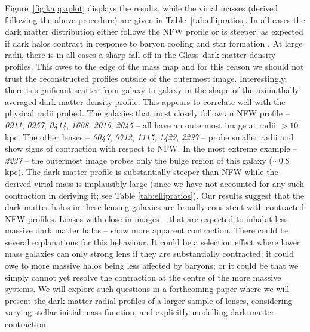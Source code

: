 \documentclass[useAMS,usenatbib]{mn2e}
\def\Glass{{\sc Glass}}
\begin{document}
Figure~\ref{fig:kappaplot} displays the results, while the virial masses (derived following the above procedure) are given in Table~\ref{tab:ellipratios}. In all cases the dark matter distribution either follows the NFW profile or is steeper, as expected if dark halos contract in response to baryon cooling and star formation \citep[e.g.][]{1991ApJ...377..365K,1994ApJ...431..617D,2007arXiv0707.0737D}. At large radii, there is in all cases a sharp fall off in the \Glass\ dark matter density profiles. This owes to the edge of the mass map and for this reason we should not trust the reconstructed profiles outside of the outermost image. Interestingly, there is significant scatter from galaxy to galaxy in the shape of the azimuthally averaged dark matter density profile. This appears to correlate well with the physical radii probed. The galaxies that most closely follow an NFW profile -- \textit{0911}, \textit{0957}, \textit{0414}, \textit{1608}, \textit{2016}, \textit{2045} -- all have an outermost image at radii $> 10$\,kpc. The other lenses -- \textit{0047}, \textit{0712}, \textit{1115}, \textit{1422}, \textit{2237} -- probe smaller radii and show signs of contraction with respect to NFW. In the most extreme example -- \textit{2237} -- the outermost image probes only the bulge region of this galaxy ($\sim 0.8$\,kpc). The dark matter profile is substantially steeper than NFW while the derived virial mass is implausibly large (since we have not accounted for any such contraction in deriving it; see Table \ref{tab:ellipratios}). Our results suggest that the dark matter halos in these lensing galaxies are broadly consistent with contracted NFW profiles. Lenses with close-in images -- that are expected to inhabit less massive dark matter halos -- show more apparent contraction. There could be several explanations for this behaviour. It could be a selection effect where lower mass galaxies can only strong lens if they are substantially contracted; it could owe to more massive halos being less affected by baryons; or it could be that we simply cannot yet resolve the contraction at the centre of the more massive systems. We will explore such questions in a forthcoming paper where we will present the dark matter radial profiles of a larger sample of lenses, considering varying stellar initial mass function, and explicitly modelling dark matter contraction.
\end{document}
